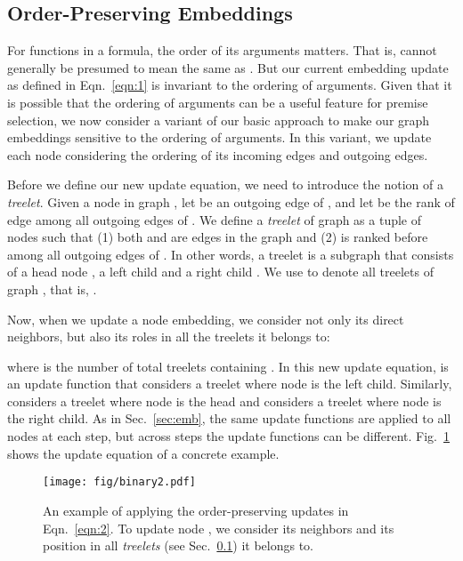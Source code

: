 \documentclass{article}
\begin{document}
\subsection{Order-Preserving Embeddings} \label{sec:ob}
For functions in a formula, the order of its arguments matters. That is,
 cannot generally be presumed to mean the same as . But our current embedding update as defined in
Eqn.~\ref{eqn:1} is invariant to the ordering of arguments. Given that it is possible that
the ordering of arguments can be a useful feature for premise selection, we now consider
a variant of our basic approach to make our graph embeddings sensitive to the
ordering of arguments. In this variant, we update each node considering the ordering of
its incoming edges and outgoing edges.

Before we define our new update equation, we need to introduce the notion
of a \emph{treelet}. Given a node  in graph , let  be an outgoing
edge of , and let  be the rank of edge  among all outgoing edges of . We define a
\emph{treelet} of graph  as a tuple of nodes  such
that (1) both 
and  are edges in the graph and (2)  is ranked before  among all outgoing edges of . In other words, a
treelet is a subgraph that consists of a head node , a left child  and a right child .  We use 
 to denote all treelets of graph , that is, . 

Now, when we update a node embedding, we consider not only its direct neighbors, but also
its roles in all the treelets it belongs to: 

where  is the number of total treelets containing . 
In this new update equation,  is an update function that considers a treelet where
node  is the left child. Similarly,  considers a treelet where node  is the
head and  considers a treelet where node  is the right
child. As in Sec.~\ref{sec:emb}, the same update functions are applied to all nodes at each step,
but across steps the update functions can be different.  Fig.~\ref{fig:binary} shows the
update equation of a concrete example. 

\begin{figure}
  \centering
    \texttt{[image: fig/binary2.pdf]}
  \caption{An example of applying the order-preserving updates in Eqn.~\ref{eqn:2}. To
    update node , we consider its neighbors and its position in all \emph{treelets} (see
    Sec.~\ref{sec:ob}) it belongs to. }
  \label{fig:binary}
  \vspace{-4mm}
\end{figure}
\end{document}
